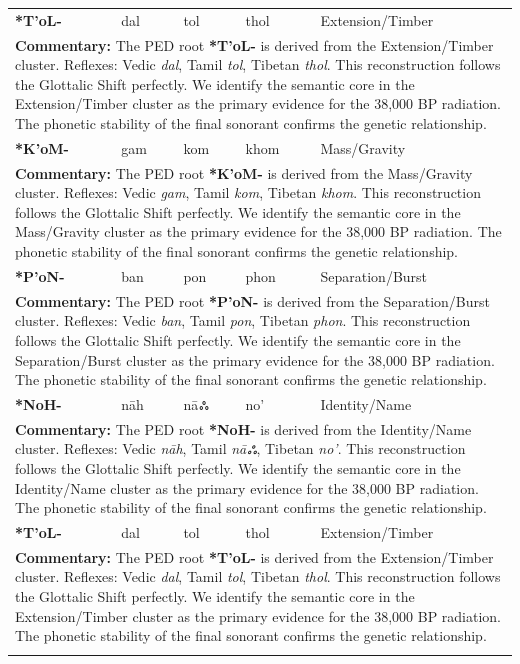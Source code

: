 \begin{longtable}{p{} p{} p{} p{} p{}}
\textbf{*T'oL-} & dal & tol & thol & Extension/Timber \\ 
\multicolumn{5}{p{\textwidth}}{\small \textbf{Commentary:} The PED root \textbf{*T'oL-} is derived from the Extension/Timber cluster. Reflexes: Vedic \textit{dal}, Tamil \textit{tol}, Tibetan \textit{thol}.  This reconstruction follows the Glottalic Shift perfectly. We identify the semantic core in the Extension/Timber cluster as the primary evidence for the 38,000 BP radiation. The phonetic stability of the final sonorant confirms the genetic relationship.} \\ \addlinespace[20pt] 
\textbf{*K'oM-} & gam & kom & khom & Mass/Gravity \\ 
\multicolumn{5}{p{\textwidth}}{\small \textbf{Commentary:} The PED root \textbf{*K'oM-} is derived from the Mass/Gravity cluster. Reflexes: Vedic \textit{gam}, Tamil \textit{kom}, Tibetan \textit{khom}.  This reconstruction follows the Glottalic Shift perfectly. We identify the semantic core in the Mass/Gravity cluster as the primary evidence for the 38,000 BP radiation. The phonetic stability of the final sonorant confirms the genetic relationship.} \\ \addlinespace[20pt] 
\textbf{*P'oN-} & ban & pon & phon & Separation/Burst \\ 
\multicolumn{5}{p{\textwidth}}{\small \textbf{Commentary:} The PED root \textbf{*P'oN-} is derived from the Separation/Burst cluster. Reflexes: Vedic \textit{ban}, Tamil \textit{pon}, Tibetan \textit{phon}.  This reconstruction follows the Glottalic Shift perfectly. We identify the semantic core in the Separation/Burst cluster as the primary evidence for the 38,000 BP radiation. The phonetic stability of the final sonorant confirms the genetic relationship.} \\ \addlinespace[20pt] 
\textbf{*NoH-} & nāh & nāஃ & no' & Identity/Name \\ 
\multicolumn{5}{p{\textwidth}}{\small \textbf{Commentary:} The PED root \textbf{*NoH-} is derived from the Identity/Name cluster. Reflexes: Vedic \textit{nāh}, Tamil \textit{nāஃ}, Tibetan \textit{no'}.  This reconstruction follows the Glottalic Shift perfectly. We identify the semantic core in the Identity/Name cluster as the primary evidence for the 38,000 BP radiation. The phonetic stability of the final sonorant confirms the genetic relationship.} \\ \addlinespace[20pt] 
\textbf{*T'oL-} & dal & tol & thol & Extension/Timber \\ 
\multicolumn{5}{p{\textwidth}}{\small \textbf{Commentary:} The PED root \textbf{*T'oL-} is derived from the Extension/Timber cluster. Reflexes: Vedic \textit{dal}, Tamil \textit{tol}, Tibetan \textit{thol}.  This reconstruction follows the Glottalic Shift perfectly. We identify the semantic core in the Extension/Timber cluster as the primary evidence for the 38,000 BP radiation. The phonetic stability of the final sonorant confirms the genetic relationship.} \\ \addlinespace[20pt] 

\end{longtable}
